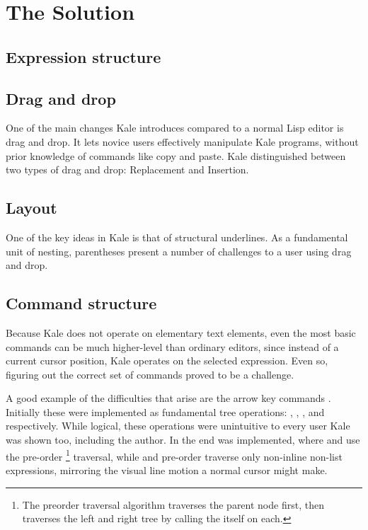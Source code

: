 \chapter{The Solution}

\section{Expression structure}

\section{Drag and drop}

One of the main changes Kale introduces compared to a normal Lisp editor is
drag and drop. It lets novice users effectively manipulate Kale programs,
without prior knowledge of commands like copy and paste. Kale distinguished
between two types of drag and drop: Replacement and Insertion. 

\section{Layout}

One of the key ideas in Kale is that of structural underlines. As a
fundamental unit of nesting, parentheses present a number of challenges to a
user using drag and drop.

\section{Command structure}

Because Kale does not operate on elementary text elements, even the most
basic
commands can be much higher-level than ordinary editors, since instead of a
current cursor position, Kale operates on the selected expression. Even so,
figuring out the correct set of commands proved to be a challenge.

A good example of the difficulties that arise are the arrow key commands
\ak{^}  \ak{<} \ak{>}. Initially these were implemented as
fundamental tree operations: , ,
, and  respectively.
While logical, these operations were unintuitive to every user
Kale was shown too, including the author. In the end  was
implemented, where \ak{<} and \ak{>} use the pre-order%
%
\footnote{The preorder traversal algorithm traverses the parent node first,
then traverses the left and right tree by calling the itself on each.}
%
traversal, while \ak{^} and 
pre-order traverse only non-inline non-list expressions, mirroring the visual
line motion a normal cursor might make.

